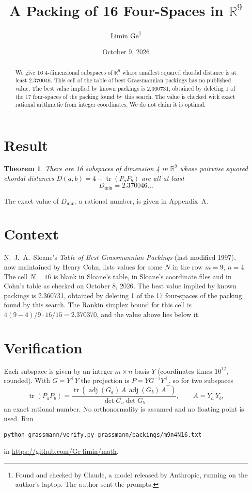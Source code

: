 \documentclass[11pt,a4paper]{article}
\title{A Packing of 16 Four-Spaces in $\mathbb{R}^{9}$}
\author{Limin Ge\thanks{Found and checked by Claude, a model released by Anthropic, running on the author's laptop. The author sent the prompts.}}
\date{October 9, 2026}
\newtheorem*{theorem}{Theorem}
\begin{document}
\maketitle
\begin{abstract}
We give 16 4-dimensional subspaces of $\mathbb{R}^{9}$ whose smallest squared chordal distance is at least 2.370046. This cell of the table of best Grassmannian packings has no published value. The best value implied by known packings is 2.360731, obtained by deleting 1 of the 17 four-spaces of the packing found by this search. The value is checked with exact rational arithmetic from integer coordinates. We do not claim it is optimal.
\end{abstract}

\section{Result}
\begin{theorem}
There are 16 subspaces of dimension 4 in $\mathbb{R}^{9}$ whose pairwise squared chordal distances $D(a,b) = 4 - \operatorname{tr}(P_aP_b)$ are all at least
\[ D_{\min} = 2.370046\ldots \]
\end{theorem}
The exact value of $D_{\min}$, a rational number, is given in Appendix~A.


\section{Context}
N.~J.~A.~Sloane's \emph{Table of Best Grassmannian Packings} (last modified 1997), now maintained by Henry Cohn, lists values for some $N$ in the row $m=9$, $n=4$. The cell $N=16$ is blank in Sloane's table, in Sloane's coordinate files and in Cohn's table as checked on October 8, 2026. The best value implied by known packings is 2.360731, obtained by deleting 1 of the 17 four-spaces of the packing found by this search. The Rankin simplex bound for this cell is $4(9-4)/9\cdot 16/15 = 2.370370$, and the value above lies below it.


\section{Verification}
Each subspace is given by an integer $m\times n$ basis $Y$ (coordinates times $10^{12}$, rounded). With $G=Y^\top Y$ the projection is $P=YG^{-1}Y^\top$, so for two subspaces
\[ \operatorname{tr}(P_aP_b)=\frac{\operatorname{tr}(\operatorname{adj}(G_a)\,A\,\operatorname{adj}(G_b)\,A^\top)}{\det G_a\det G_b},\qquad A=Y_a^\top Y_b, \]
an exact rational number. No orthonormality is assumed and no floating point is used. Run
\begin{verbatim}
python grassmann/verify.py grassmann/packings/m9n4N16.txt
\end{verbatim}
in \url{https://github.com/Ge-limin/math}.
\end{document}

